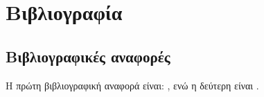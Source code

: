 \chapter{Βιβλιογραφία}
\section{Βιβλιογραφικές αναφορές}
H πρώτη βιβλιογραφική αναφορά είναι: \cite{pdf-license}, ενώ η δεύτερη είναι \parencite{europe-copyright}.

\printbibliography[title={Βιβλιογραφία}]